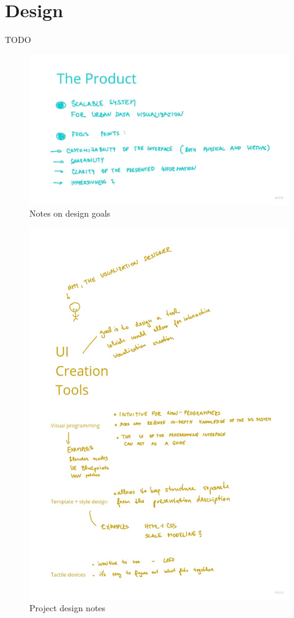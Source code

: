 \section{Design}
TODO

\begin{figure}[h]
    \centering
    \includegraphics[width=\linewidth]{img/product.jpg}
    \caption{Notes on design goals}
\end{figure}

\begin{figure}[h]
    \centering
    \includegraphics[width=\linewidth]{img/tools.jpg}
    \caption{Project design notes}
\end{figure}